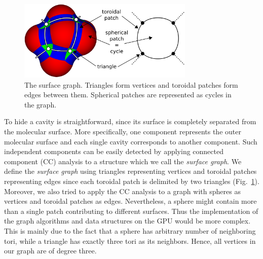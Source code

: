 
\begin{figure}[htb]
  \centering
  \includegraphics[width=3.3in]{image/graph.png}
  \caption{The surface graph.
	Triangles form vertices and toroidal patches form edges between them.
	Spherical patches are represented as cycles in the graph.}
	\label{fig:graph}
\end{figure}

To hide a cavity is straightforward, since its surface is completely separated from the molecular surface.
More specifically, one component represents the outer molecular surface and each single cavity corresponds to another component.
Such independent components can be easily detected by applying connected component (CC) analysis to a structure which we call the \textit{surface graph}.
We define the \textit{surface graph} using triangles representing vertices and toroidal patches representing edges since each toroidal patch is delimited by two triangles (Fig.~\ref{fig:graph}).
Moreover, we also tried to apply the CC analysis to a graph with spheres as vertices and toroidal patches as edges.
Nevertheless, a sphere might contain more than a single patch contributing to different surfaces.
Thus the implementation of the graph algorithms and data structures on the GPU would be more complex.
This is mainly due to the fact that a sphere has arbitrary number of neighboring tori, while a triangle has exactly three tori as its neighbors. Hence, all vertices in our graph are of degree three.

